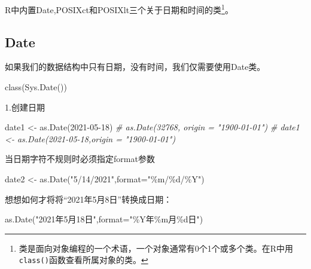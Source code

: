 \documentclass[
]{book}
\newenvironment{Shaded}{\begin{snugshade}}{\end{snugshade}}
\newcommand{\AttributeTok}[1]{\textcolor[rgb]{0.77,0.63,0.00}{#1}}
\newcommand{\CommentTok}[1]{\textcolor[rgb]{0.56,0.35,0.01}{\textit{#1}}}
\newcommand{\FunctionTok}[1]{\textcolor[rgb]{0.00,0.00,0.00}{#1}}
\newcommand{\NormalTok}[1]{#1}
\newcommand{\OtherTok}[1]{\textcolor[rgb]{0.56,0.35,0.01}{#1}}
\newcommand{\StringTok}[1]{\textcolor[rgb]{0.31,0.60,0.02}{#1}}
\begin{document}
R中内置Date,POSIXct和POSIXlt三个关于日期和时间的类\footnote{类是面向对象编程的一个术语，一个对象通常有0个1个或多个类。在R中用\texttt{class()}函数查看所属对象的类。}。

\hypertarget{datetime:base-R-date}{%
\subsection{Date}\label{datetime:base-R-date}}

如果我们的数据结构中只有日期，没有时间，我们仅需要使用Date类。

\begin{Shaded}
\begin{Highlighting}[]
\FunctionTok{class}\NormalTok{(}\FunctionTok{Sys.Date}\NormalTok{())}
\end{Highlighting}
\end{Shaded}

1.创建日期

\begin{Shaded}
\begin{Highlighting}[]
\NormalTok{date1 }\OtherTok{\textless{}{-}} \FunctionTok{as.Date}\NormalTok{(}\StringTok{\textquotesingle{}2021{-}05{-}18\textquotesingle{}}\NormalTok{)}
\CommentTok{\# as.Date(32768, origin = "1900{-}01{-}01")}
\CommentTok{\# date1 \textless{}{-} as.Date(\textquotesingle{}2021{-}05{-}18\textquotesingle{},origin = "1900{-}01{-}01")}
\end{Highlighting}
\end{Shaded}

当日期字符不规则时必须指定format参数

\begin{Shaded}
\begin{Highlighting}[]
\NormalTok{date2 }\OtherTok{\textless{}{-}} \FunctionTok{as.Date}\NormalTok{(}\StringTok{"5/14/2021"}\NormalTok{,}\AttributeTok{format=}\StringTok{"\%m/\%d/\%Y"}\NormalTok{)}
\end{Highlighting}
\end{Shaded}

想想如何才将将``2021年5月8日''转换成日期：

\begin{Shaded}
\begin{Highlighting}[]
\FunctionTok{as.Date}\NormalTok{(}\StringTok{"2021年5月18日"}\NormalTok{,}\AttributeTok{format=}\StringTok{"\%Y年\%m月\%d日"}\NormalTok{)}
\end{Highlighting}
\end{Shaded}
\end{document}
